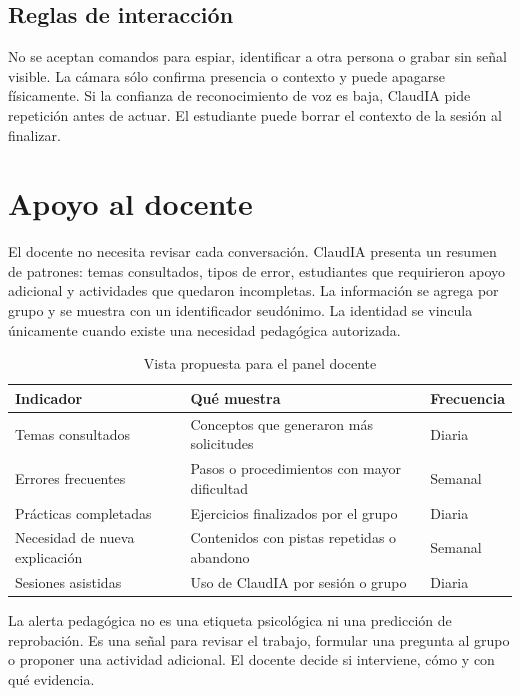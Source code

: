 \documentclass[letterpaper,11pt]{article}
\begin{document}
\subsection{Reglas de interacción}
No se aceptan comandos para espiar, identificar a otra persona o grabar sin señal visible. La cámara sólo confirma presencia o contexto y puede apagarse físicamente. Si la confianza de reconocimiento de voz es baja, ClaudIA pide repetición antes de actuar. El estudiante puede borrar el contexto de la sesión al finalizar.

\clearpage

\section{Apoyo al docente}

El docente no necesita revisar cada conversación. ClaudIA presenta un resumen de patrones: temas consultados, tipos de error, estudiantes que requirieron apoyo adicional y actividades que quedaron incompletas. La información se agrega por grupo y se muestra con un identificador seudónimo. La identidad se vincula únicamente cuando existe una necesidad pedagógica autorizada.

\begin{table}[H]
\centering
\caption{Vista propuesta para el panel docente}
\begin{tabularx}{\textwidth}{@{}>{\raggedright\arraybackslash}p{1.36in}>{\raggedright\arraybackslash}X>{\centering\arraybackslash}p{0.9in}@{}}
\toprule
\textbf{Indicador} & \textbf{Qué muestra} & \textbf{Frecuencia} \\
\midrule
Temas consultados & Conceptos que generaron más solicitudes & Diaria \\
Errores frecuentes & Pasos o procedimientos con mayor dificultad & Semanal \\
Prácticas completadas & Ejercicios finalizados por el grupo & Diaria \\
Necesidad de nueva explicación & Contenidos con pistas repetidas o abandono & Semanal \\
Sesiones asistidas & Uso de ClaudIA por sesión o grupo & Diaria \\
\bottomrule
\end{tabularx}
\end{table}

La alerta pedagógica no es una etiqueta psicológica ni una predicción de reprobación. Es una señal para revisar el trabajo, formular una pregunta al grupo o proponer una actividad adicional. El docente decide si interviene, cómo y con qué evidencia.
\end{document}

